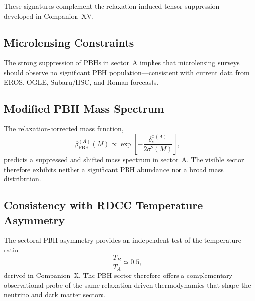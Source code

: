 \documentclass[11pt,a4paper]{article}
\begin{document}
These signatures complement the relaxation-induced tensor suppression developed in
Companion~XV.


\subsection{Microlensing Constraints}

The strong suppression of PBHs in sector~A implies that microlensing surveys should observe no
significant PBH population—consistent with current data from EROS, OGLE, Subaru/HSC, and
Roman forecasts.


\subsection{Modified PBH Mass Spectrum}

The relaxation-corrected mass function,
\begin{equation}
\beta_{\mathrm{PBH}}^{(A)}(M)
\propto
\exp\!\left[
-\frac{\delta_{c}^{2\,(A)}}{2\sigma^{2}(M)}
\right],
\end{equation}
predicts a suppressed and shifted mass spectrum in sector~A. The visible sector therefore
exhibits neither a significant PBH abundance nor a broad mass distribution.


\subsection{Consistency with RDCC Temperature Asymmetry}

The sectoral PBH asymmetry provides an independent test of the temperature ratio
\begin{equation}
\frac{T_{B}}{T_{A}} \simeq 0.5,
\end{equation}
derived in Companion~X. The PBH sector therefore offers a complementary observational probe
of the same relaxation-driven thermodynamics that shape the neutrino and dark matter sectors.
\end{document}
